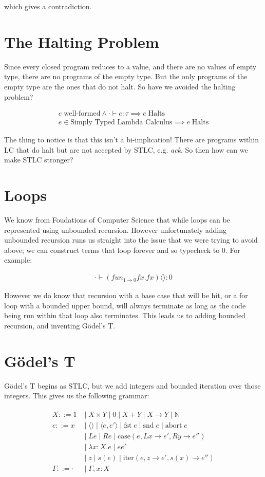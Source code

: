 \documentclass{article}
\newcommand{\inlineeq}[1]{
    \vspace{-2em}
    \begin{gather*}
    #1
    \end{gather*}
    \vspace{-2em}
}
\begin{document}
which gives a contradiction.

\newpage
\section{The Halting Problem}

Since every closed program reduces to a value, and there are no values of empty type, there are no programs of the empty type. But the only programs of the empty type are the ones that do not halt. So have we avoided the halting problem?

\inlineeq{
e \; \textrm{well-formed} \land \cdot \vdash e : \tau \implies e \; \textrm{Halts}\\
e \in \textrm{Simply Typed Lambda Calculus} \implies e \; \textrm{Halts}
}

The thing to notice is that this isn't a bi-implication! There are programs within LC that do halt but are not accepted by STLC, e.g. \textit{ack}. So then how can we make STLC stronger?

\section{Loops}

We know from Foudations of Computer Science that while loops can be represented using unbounded recursion. However unfortunately adding unbounded recursion runs us straight into the issue that we were trying to avoid above; we can construct terms that loop forever and so typecheck to 0. For example:

\inlineeq{
\cdot \vdash (fun_{1\to 0} f x. f x) \langle \rangle : 0
}

However we do know that recursion with a base case that will be hit, or a for loop with a bounded upper bound, will always terminate as long as the code being run within that loop also terminates. This leads us to adding bounded recursion, and inventing Gödel’s T.

\newpage
\section{Gödel’s T}

Gödel’s T begins as STLC, but we add integers and bounded iteration over those integers. This gives us the following grammar:

\inlineeq{
\begin{split}
X ::= 1 \; &| \; X \times Y \; | \; 0 \; | \; X + Y \; | \; X \to Y \; | \; \mathbb{N} \\
e ::= x \; &| \; \langle \rangle  \; | \; \langle e, e'\rangle  \; | \; \textrm{fst} \; e \; | \; \textrm{snd} \; e \; | \; \textrm{abort} \; e \\
&| \; L e \; | \; R e \; | \; \textrm{case}(e, L x \to e', R y \to e'') \\
&| \; \lambda x : X. e \; | \; e e' \\ 
&| \; z \; | \; s(e) \; | \; \textrm{iter}(e, z \to e', s(x) \to e'') \\
\Gamma ::= \cdot  \; &| \; \Gamma, x : X
\end{split}
}
\end{document}
